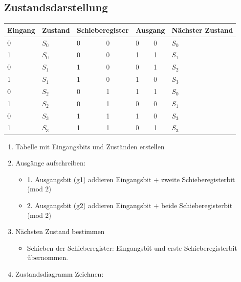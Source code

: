 \subsection{Zustandsdarstellung}
\begin{center}
    \begin{tabular}{p{0.7cm} | p{0.7cm}  p{.7cm} p{.4cm} | p{.3cm} p{.1cm} | p{1cm}}
        \hline
        Eingang & Zustand & \multicolumn{2}{p{.1cm}|}{Schieberegister} & \multicolumn{2}{p{.1cm}|}{Ausgang} & Nächster Zustand \\
        \hline
        \hline
        0   &   $S_0$   &   0   &   0   &   0   &   0   &   $S_0$\\
        1   &   $S_0$   &   0   &   0   &   1   &   1   &   $S_1$\\ \hline
        0   &   $S_1$   &   1   &   0   &   0   &   1   &   $S_2$\\
        1   &   $S_1$   &   1   &   0   &   1   &   0   &   $S_3$\\ \hline
        0   &   $S_2$   &   0   &   1   &   1   &   1   &   $S_0$\\
        1   &   $S_2$   &   0   &   1   &   0   &   0   &   $S_1$\\ \hline
        0   &   $S_3$   &   1   &   1   &   1   &   0   &   $S_3$\\
        1   &   $S_3$   &   1   &   1   &   0   &   1   &   $S_3$\\
    \end{tabular}
\end{center}
\begin{enumerate}
    \item Tabelle mit Eingangsbits und Zuständen erstellen
    \item Ausgänge aufschreiben:
    \begin{itemize}
        \item 1. Ausgangsbit (g1) addieren Eingangsbit $+$ zweite Schieberegisterbit (mod 2)
        \item 2. Ausgangsbit (g2) addieren Eingangsbit $+$ beide Schieberegisterbit (mod 2)
    \end{itemize}
    \item Nächsten Zustand bestimmen
    \begin{itemize}
        \item Schieben der Schieberegister: Eingangsbit und erste Schieberegisterbit übernommen.
    \end{itemize}
    \item Zustandsdiagramm Zeichnen:
\end{enumerate}
